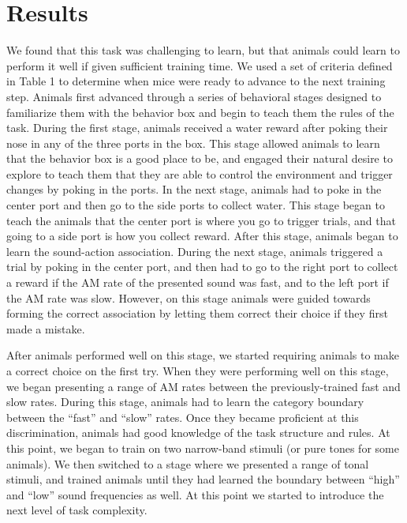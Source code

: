 \section{Results}

We found that this task was challenging to learn, but that animals could learn
to perform it well if given sufficient training time.
%
We used a set of criteria defined in Table 1 to determine when mice were ready
to advance to the next training step.
%
Animals first advanced through a series of behavioral stages designed to
familiarize them with the behavior box and begin to teach them the rules of the
task.
%
During the first stage, animals received a water reward after poking their nose
in any of the three ports in the box.
%
This stage allowed animals to learn that the behavior box is a good place to
be, and engaged their natural desire to explore to teach them that they are
able to control the environment and trigger changes by poking in the ports.
%
In the next stage, animals had to poke in the center port and then go to the
side ports to collect water.
%
This stage began to teach the animals that the center port is where you go to
trigger trials, and that going to a side port is how you collect reward.
%
After this stage, animals began to learn the sound-action association.
%
During the next stage, animals triggered a trial by poking in the center port,
and then had to go to the right port to collect a reward if the AM rate of the
presented sound was fast, and to the left port if the AM rate was slow.
%
However, on this stage animals were guided towards forming the correct
association by letting them correct their choice if they first made a mistake.
%

After animals performed well on this stage, we started requiring animals to
make a correct choice on the first try.
%
When they were performing well on this stage, we began presenting a range of AM
rates between the previously-trained fast and slow rates.
%
During this stage, animals had to learn the category boundary between the
``fast'' and ``slow'' rates.
%
Once they became proficient at this discrimination, animals had good knowledge
of the task structure and rules.
%
At this point, we began to train on two narrow-band stimuli (or pure tones for
some animals).
%
We then switched to a stage where we presented a range of tonal stimuli, and
trained animals until they had learned the boundary between ``high'' and
``low'' sound frequencies as well.
%
At this point we started to introduce the next level of task complexity.

